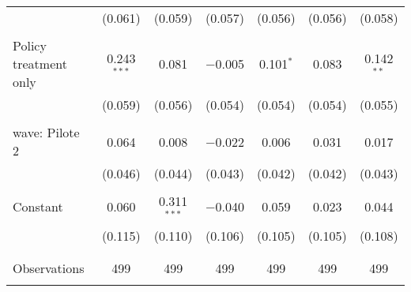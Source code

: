\begin{tabular}{@{\extracolsep{5pt}}lcccccc}
  & (0.061) & (0.059) & (0.057) & (0.056) & (0.056) & (0.058) \\ 
  & & & & & & \\ 
 Policy treatment only & 0.243$^{***}$ & 0.081 & $-$0.005 & 0.101$^{*}$ & 0.083 & 0.142$^{**}$ \\ 
  & (0.059) & (0.056) & (0.054) & (0.054) & (0.054) & (0.055) \\ 
  & & & & & & \\ 
 wave: Pilote 2 & 0.064 & 0.008 & $-$0.022 & 0.006 & 0.031 & 0.017 \\ 
  & (0.046) & (0.044) & (0.043) & (0.042) & (0.042) & (0.043) \\ 
  & & & & & & \\ 
 Constant & 0.060 & 0.311$^{***}$ & $-$0.040 & 0.059 & 0.023 & 0.044 \\ 
  & (0.115) & (0.110) & (0.106) & (0.105) & (0.105) & (0.108) \\ 
  & & & & & & \\ 
\hline \\[-1.8ex] 

Observations & 499 & 499 & 499 & 499 & 499 & 499 \\ 
\hline 
\hline \\[-1.8ex] 
\end{tabular} 